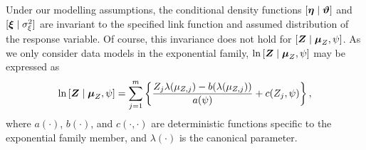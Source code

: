 \documentclass[nojss]{jss}
\def\mbf#1{{%
\mathchoice%
{\hbox{\boldmath$\displaystyle{#1}$}}%
{\hbox{\boldmath$\textstyle{#1}$}}%
{\hbox{\boldmath$\scriptstyle{#1}$}}%
{\hbox{\boldmath$\scriptscriptstyle{#1}$}}%
}}
\def\vec{\mbf}
\begin{document}
Under our modelling assumptions, the conditional density functions  $[\vec{\eta}\mid\vec{\vartheta}]$ and $[\vec{\xi} \mid \sigma^2_\xi]$ are invariant to the specified link function and assumed distribution of the response variable. 
 Of course, this invariance does not hold for $[\vec{Z} \mid \vec{\mu}_Z, \psi]$. 
As we only consider data models in the exponential family, $\ln{[\vec{Z}  \mid  \vec{\mu}_Z, \psi]}$ may be expressed as  
\begin{equation}\label{eqn:ln[Z|Y],ExpFam}
\ln{[\vec{Z} \mid \vec{\mu}_Z, \psi]}
=
\sum_{j=1}^m\left\{
\frac{Z_j\lambda(\mu_{Z, j}) - b(\lambda(\mu_{Z, j}))}{a(\psi)} + c(Z_j, \psi)\right\},
\end{equation}
where $a(\cdot)$, $b(\cdot)$, and $c(\cdot, \cdot)$ are deterministic functions specific to the exponential family member, and $\lambda(\cdot)$ is the canonical parameter. %

\end{document}
